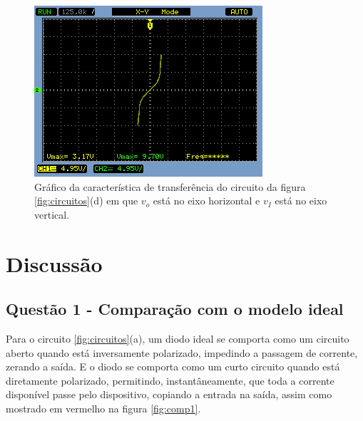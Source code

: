 \documentclass{abntex2}
\begin{document}
\begin{figure}[h]
  \centering
  \includegraphics[width=.8\textwidth]{diferenca-1d.png}
  \caption{Gráfico da característica de transferência do circuito da figura \ref{fig:circuitos}(d) em que $v_o$ está no eixo horizontal e $v_I$ está no eixo vertical.}
  \label{fig:diff4}
\end{figure}

\chapter{Discussão}

\section{Questão 1 - Comparação com o modelo ideal}
Para o circuito \ref{fig:circuitos}(a), um diodo ideal se comporta como um circuito aberto quando está inversamente polarizado, impedindo a passagem de corrente, zerando a saída. E o diodo se comporta como um curto circuito quando está diretamente polarizado,
permitindo, instantâneamente, que toda a corrente disponível passe pelo dispositivo, copiando a entrada na saída, assim como mostrado em vermelho na figura \ref{fig:comp1}.
\end{document}
